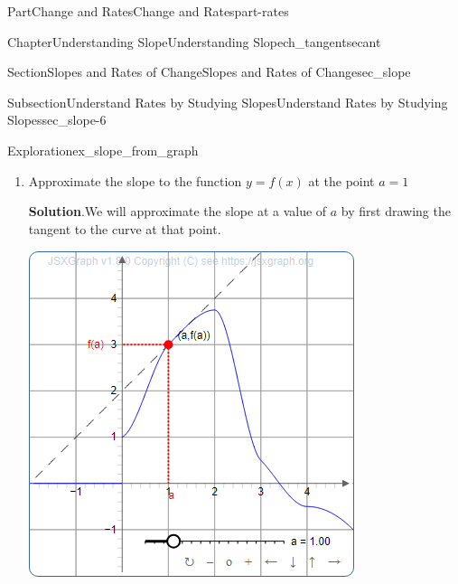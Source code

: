 \documentclass{tufte-book}
\newcommand{\blocktitlefont}{\relax}
\numberwithin{equation}{chapter}
\begin{document}
\begin{partptx}{Part}{Change and Rates}{}{Change and Rates}{}{}{part-rates}
\begin{chapterptx}{Chapter}{Understanding Slope}{}{Understanding Slope}{}{}{ch_tangentsecant}
\begin{sectionptx}{Section}{Slopes and Rates of Change}{}{Slopes and Rates of Change}{}{}{sec_slope}
\begin{subsectionptx}{Subsection}{Understand Rates by Studying Slopes}{}{Understand Rates by Studying Slopes}{}{}{sec_slope-6}
\begin{exploration}{Exploration}{}{ex_slope_from_graph}
\begin{image}{0.2}{0.6}{0.2}{}
{\begin{tikzpicture}
\end{tikzpicture}
}%
\end{image}%
\begin{enumerate}[font=\bfseries,label=(\alph*),ref=\alph*]%
\item{}Approximate the slope to the function \(y=f(x)\) at the point \(a=1\)%
\par\smallskip%
\noindent\textbf{\blocktitlefont Solution}.\hypertarget{ex_slope_from_graph-2-2}{}\quad{}We will approximate the slope at a value of \(a\) by first drawing the tangent to the curve at that point.%
\begin{sidebyside}{2}{0.075}{0.075}{0.17}%
\begin{sbspanel}{0.47}%
\includegraphics[width=\linewidth]{generated/preview/ex_slope_from_graph-2-2-2-preview.png}
\end{sbspanel}%
\begin{sbspanel}{0.21}%

\end{sbspanel}
\end{sidebyside}
\end{enumerate}
\end{exploration}
\end{subsectionptx}
\end{sectionptx}
\end{chapterptx}
\end{partptx}
\end{document}
